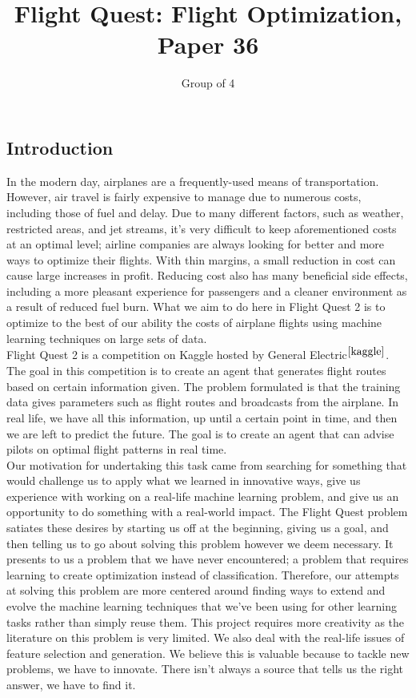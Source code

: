 \documentclass{article}[12pt]
\begin{document}
\title{Flight Quest: Flight Optimization, Paper 36}
\author{
	Group of 4
}
\date{}
\maketitle

\setlength{\columnsep}{1cm}
\begin{multicols}{2}

\section{Introduction}
In the modern day, airplanes are a frequently-used means of transportation. However, air travel is fairly expensive to manage due to numerous costs, including those of fuel and delay. Due to many different factors, such as weather, restricted areas, and jet streams, it's very difficult to keep aforementioned costs at an optimal level; airline companies are always looking for better and more ways to optimize their flights. With thin margins, a small reduction in cost can cause large increases in profit. Reducing cost also has many beneficial side effects, including a more pleasant experience for passengers and a cleaner environment as a result of reduced fuel burn. What we aim to do here in Flight Quest 2 is to optimize to the best of our ability the costs of airplane flights using machine learning techniques on large sets of data.\\

Flight Quest 2 is a competition on Kaggle hosted by General Electric$^{\cite{kaggle}}$.  The goal in this competition is to create an agent that generates flight routes based on certain information given. The problem formulated is that the training data gives parameters such as flight routes and broadcasts from the airplane. In real life, we have all this information, up until a certain point in time, and then we are left to predict the future. The goal is to create an agent that can advise pilots on optimal flight patterns in real time.\\

Our motivation for undertaking this task came from searching for something that would challenge us to apply what we learned in innovative ways, give us experience with working on a real-life machine learning problem, and give us an opportunity to do something with a real-world impact. The Flight Quest problem satiates these desires by starting us off at the beginning, giving us a goal, and then telling us to go about solving this problem however we deem necessary. It presents to us a problem that we have never encountered; a problem that requires learning to create optimization instead of classification. Therefore, our attempts at solving this problem are more centered around finding ways to extend and evolve the machine learning techniques that we've been using for other learning tasks rather than simply reuse them. This project requires more creativity as the literature on this problem is very limited. We also deal with the real-life issues of feature selection and generation. We believe this is valuable because to tackle new problems, we have to innovate. There isn't always a source that tells us the right answer, we have to find it.
 

\end{multicols}
\end{document}
